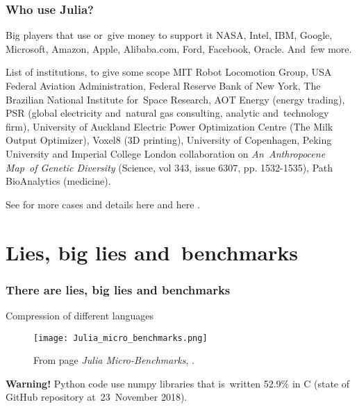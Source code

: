 \documentclass{beamer}  %
\begin{document}
\begin{frame}
  \frametitle{Who use Julia?}

  \begin{block}{Big players that use or~give money to support it}
    NASA, Intel, IBM, Google, Microsoft, Amazon, Apple, Alibaba.com,
    Ford, Facebook, Oracle. And~few more.
  \end{block}
  
  \begin{block}{List of institutions, to give some scope}
    MIT Robot Locomotion Group, USA Federal Aviation Administration,
    Federal Reserve Bank of New York, The Brazilian National Institute
    for~Space Research, AOT Energy (energy trading), PSR (global
    electricity and~natural gas consulting, analytic and~technology
    firm), University of Auckland Electric Power Optimization Centre
    (The Milk Output Optimizer), Voxel8 (3D printing), University of
    Copenhagen, Peking University and Imperial College London
    collaboration on \emph{An~Anthropocene Map~of Genetic Diversity}
    (Science, vol 343, issue 6307, pp. 1532-1535), Path BioAnalytics
    (medicine).
  \end{block}

  \begin{block}{}
    See for more cases and details here
     and here
    .
  \end{block}

\end{frame}





\section[]{Lies, big lies and~benchmarks}




\begin{frame}
  \frametitle{There are lies, big lies and benchmarks}

  \begin{block}{Compression of different languages}
    \begin{figure}
      \centering

      \texttt{[image: Julia\_micro\_benchmarks.png]}
      \caption{From page \emph{Julia Micro-Benchmarks},
        .}
    \end{figure}

    \textbf{Warning!} Python code use numpy libraries that is~written
    52.9\% in C (state of GitHub repository at~23~November 2018).
  \end{block}
  
\end{frame}
\end{document}
